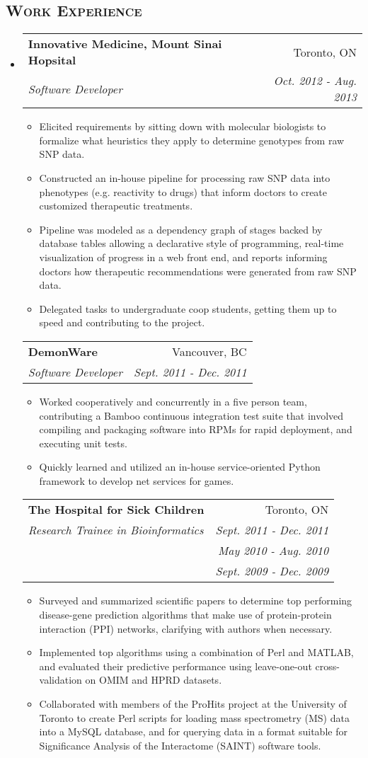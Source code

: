 \documentclass[letterpaper,11pt]{article}
\makeatletter
\newcommand{\company}[1]{
    \textbf{#1}
}
\newcommand{\heading}[1]{
    \textsc{\textbf{#1}}
}
\newcommand*\resheading[1]{\subsection*{\heading{#1}}\vspace{0.3em}\nopagebreak[4]}
\newcommand{\resitem}[1]{\item #1 \vspace{-2pt}}
\newcommand{\ressubheading}[4]{
\begin{tabular*}{6.5in}{l@{\extracolsep{\fill}}r}
    
		\company{#1} & #2 \\
		\textit{#3} & \textit{#4} \\
\end{tabular*}\vspace{-6pt}}
\newcommand{\sickkids}[6]{
\begin{tabular*}{6.5in}{l@{\extracolsep{\fill}}r}
		\company{#1} & #2 \\
		\textit{#3} & \textit{#4} \\
		 & \textit{#5} \\
		 & \textit{#6} \\
\end{tabular*}\vspace{-6pt}}
\makeatother
\begin{document}
\resheading{Work Experience}
\begin{itemize}
\item

	\ressubheading{Innovative Medicine, Mount Sinai Hopsital}{Toronto, ON}{Software Developer}{Oct. 2012 - Aug. 2013}
	\begin{itemize}
		\resitem{
            Elicited requirements by sitting down with molecular biologists to formalize 
            what heuristics they apply to determine genotypes from raw SNP data.
        }
		\resitem{
            Constructed an in-house pipeline for processing raw SNP data into phenotypes 
            (e.g. reactivity to drugs) that inform doctors to create customized therapeutic 
            treatments.  
        }
        \resitem{
            Pipeline was modeled as a dependency graph of stages backed by database 
            tables allowing a declarative style of programming, real-time 
            visualization of progress in a web front end, and reports informing 
            doctors how therapeutic recommendations were generated from raw SNP data.
        }
        \resitem{
            Delegated tasks to undergraduate coop students, getting them up to speed and 
            contributing to the project.
        }
	\end{itemize}

	\ressubheading{DemonWare}{Vancouver, BC}{Software Developer}{Sept. 2011 - Dec. 2011}
	\begin{itemize}
		\resitem{
            Worked cooperatively and concurrently in a five person team, contributing a 
            Bamboo continuous integration test suite that involved compiling and packaging 
            software into RPMs for rapid deployment, and executing unit tests.
        }
        \resitem{
            Quickly learned and utilized an in-house service-oriented Python framework to 
            develop net services for games.
        }
	\end{itemize}

	\sickkids{The Hospital for Sick Children}{Toronto, ON}{Research Trainee in 
    Bioinformatics}{Sept. 2011 - Dec. 2011}{May 2010 - Aug. 2010}{Sept. 2009 - Dec. 2009}
	\begin{itemize}
		\resitem{
             Surveyed and summarized scientific papers to determine top performing 
             disease-gene prediction algorithms that make use of protein-protein interaction 
             (PPI) networks, clarifying with authors when necessary.
        }
        \resitem{
             Implemented top algorithms using a combination of Perl and MATLAB, and 
             evaluated their predictive performance using leave-one-out cross-validation on 
             OMIM and HPRD datasets.
        }
        \resitem{
             Collaborated with members of the ProHits project at the University of Toronto 
             to create Perl scripts for loading mass spectrometry (MS) data into a MySQL 
             database, and for querying data in a format suitable for Significance Analysis 
             of the Interactome (SAINT) software tools.
        }
	\end{itemize}

\end{itemize}
\end{document}
